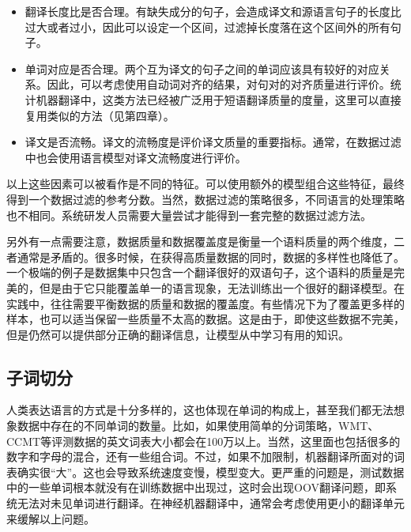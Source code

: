 \begin{itemize}
\vspace{0.5em}
\item 翻译长度比是否合理。有缺失成分的句子，会造成译文和源语言句子的长度比过大或者过小，因此可以设定一个区间，过滤掉长度落在这个区间外的所有句子。
\vspace{0.5em}
\item 单词对应是否合理。两个互为译文的句子之间的单词应该具有较好的对应关系。因此，可以考虑使用自动词对齐的结果，对句对的对齐质量进行评价。统计机器翻译中，这类方法已经被广泛用于短语翻译质量的度量，这里可以直接复用类似的方法（见第四章）。
\vspace{0.5em}
\item 译文是否流畅。译文的流畅度是评价译文质量的重要指标。通常，在数据过滤中也会使用语言模型对译文流畅度进行评价。
\vspace{0.5em}
\end{itemize}

\parinterval 以上这些因素可以被看作是不同的特征。可以使用额外的模型组合这些特征，最终得到一个数据过滤的参考分数。当然，数据过滤的策略很多，不同语言的处理策略也不相同。系统研发人员需要大量尝试才能得到一套完整的数据过滤方法。

\parinterval 另外有一点需要注意，数据质量和数据覆盖度是衡量一个语料质量的两个维度，二者通常是矛盾的。很多时候，在获得高质量数据的同时，数据的多样性也降低了。一个极端的例子是数据集中只包含一个翻译很好的双语句子，这个语料的质量是完美的，但是由于它只能覆盖单一的语言现象，无法训练出一个很好的翻译模型。在实践中，往往需要平衡数据的质量和数据的覆盖度。有些情况下为了覆盖更多样的样本，也可以适当保留一些质量不太高的数据\cite{姚树杰2011}。这是由于，即使这些数据不完美，但是仍然可以提供部分正确的翻译信息，让模型从中学习有用的知识。


\subsection{子词切分}

\parinterval 人类表达语言的方式是十分多样的，这也体现在单词的构成上，甚至我们都无法想象数据中存在的不同单词的数量。比如，如果使用简单的分词策略，WMT、CCMT等评测数据的英文词表大小都会在100万以上。当然，这里面也包括很多的数字和字母的混合，还有一些组合词。不过，如果不加限制，机器翻译所面对的词表确实很``大''。这也会导致系统速度变慢，模型变大。更严重的问题是，测试数据中的一些单词根本就没有在训练数据中出现过，这时会出现OOV翻译问题，即系统无法对未见单词进行翻译。在神经机器翻译中，通常会考虑使用更小的翻译单元来缓解以上问题。

